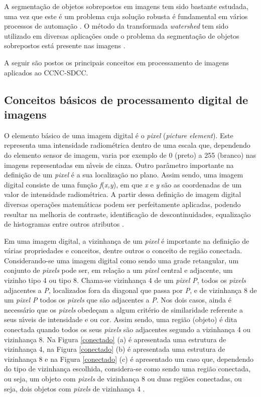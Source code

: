 A segmenta\c{c}\~{a}o de objetos sobrepostos em imagens tem sido bastante estudada, uma vez que este \'{e} um problema cuja solu\c{c}\~{a}o robusta \'{e} fundamental em v\'{a}rios processos de automa\c{c}\~{a}o \cite{Schmitt,Albuquerque,Pavlidis,Felix,Norberto}. O m\'{e}todo da transformada \emph{watershed} tem sido utilizado em diversas aplica\c{c}\~{o}es onde o problema da segmenta\c{c}\~{a}o de objetos sobrepostos est\'{a} presente nas imagens \cite{Xiaodong,Mao,Parvati,Li,Xie}.

A seguir s\~{a}o postos os principais conceitos em processamento de imagens aplicados ao CCNC-SDCC.


\subsection{Conceitos b\'{a}sicos de processamento digital de imagens}
O elemento b\'{a}sico de uma imagem digital \'{e} o \textit{pixel} (\textit{picture element}). Este representa uma intensidade radiom\'{e}trica dentro de uma escala que, dependendo do elemento sensor de imagem, varia por exemplo  de 0 (preto) a 255 (branco) nas imagens representadas em n\'{\i}veis de cinza. Outro par\^{a}metro importante na defini\c{c}\~{a}o de um \textit{pixel} \'{e} a sua localiza\c{c}\~{a}o no plano. Assim sendo, uma imagem digital consiste de uma fun\c{c}\~{a}o \textit{f}(\textit{x,y}), em que \textit{x} e \textit{y} s\~{a}o as coordenadas de um valor de intensidade radiom\'{e}trica. A partir dessa defini\c{c}\~{a}o de imagem digital diversas opera\c{c}\~{o}es matem\'{a}ticas podem ser perfeitamente aplicadas, podendo resultar na melhoria de contraste, identifica\c{c}\~{a}o de descontinuidades, equaliza\c{c}\~{a}o de histogramas entre outros atributos \cite{Gonzales}.

Em uma imagem digital, a vizinhan\c{c}a de um \textit{pixel} \'{e} importante na defini\c{c}\~{a}o de v\'{a}rias propriedades e conceitos, dentre outros o conceito de regi\~{a}o conectada. Considerando-se uma imagem digital como sendo uma grade retangular, um conjunto de \textit{pixels} pode ser, em rela\c{c}\~{a}o a um \textit{pixel} central e adjacente, um vizinho tipo 4 ou tipo 8. Chama-se vizinhan\c{c}a 4 de um \textit{pixel P}, todos os \textit{pixels} adjacentes a \textit{P}, localizados fora da diagonal que passa por \textit{P}, e de vizinhan\c{c}a 8 de um \textit{pixel P} todos os \textit{pixels} que s\~{a}o adjacentes a \textit{P}. Nos dois casos, ainda \'{e} necess\'{a}rio que os \textit{pixels} obede\c{c}am a algum crit\'{e}rio de similaridade referente a seus n\'{\i}veis de intensidade e ou cor. Assim sendo, uma regi\~{a}o (objeto) \'{e} dita conectada quando todos os seus \textit{pixels} s\~{a}o adjacentes segundo a vizinhan\c{c}a 4 ou vizinhan\c{c}a 8. Na Figura \ref {conectado} (a) \'{e} apresentada uma estrutura de vizinhan\c{c}a 4, na Figura \ref {conectado} (b) \'{e} apresentada uma estrutura de vizinhan\c{c}a 8 e na Figura \ref {conectado} (c) \'{e} apresentado um caso que, dependendo do tipo de vizinhan\c{c}a escolhida, considera-se como sendo uma regi\~{a}o conectada, ou seja, um objeto com \textit{pixels} de vizinhan\c{c}a 8 ou duas regi\~{o}es conectadas, ou seja, dois objetos com \textit{pixels} de vizinhan\c{c}a 4 \cite{bernd}.

